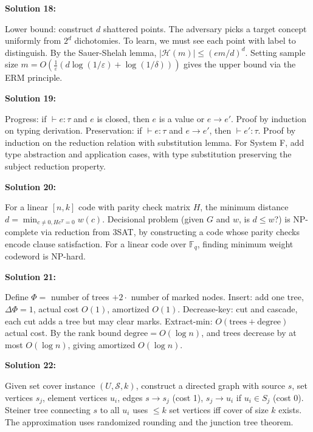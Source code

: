 \documentclass[12pt,a4paper]{exam}
\begin{document}
\vspace{0.5cm}

\textbf{Solution 18:}

Lower bound: construct $d$ shattered points. The adversary picks a target concept uniformly from $2^d$ dichotomies. To learn, we must see each point with label to distinguish. By the Sauer-Shelah lemma, $|\mathcal{H}(m)| \leq (em/d)^d$. Setting sample size $m = O(\frac{1}{\varepsilon}(d \log(1/\varepsilon) + \log(1/\delta)))$ gives the upper bound via the ERM principle.

\vspace{0.5cm}

\textbf{Solution 19:}

Progress: if $\vdash e: \tau$ and $e$ is closed, then $e$ is a value or $e \to e'$. Proof by induction on typing derivation. Preservation: if $\vdash e: \tau$ and $e \to e'$, then $\vdash e': \tau$. Proof by induction on the reduction relation with substitution lemma. For System F, add type abstraction and application cases, with type substitution preserving the subject reduction property.

\vspace{0.5cm}

\textbf{Solution 20:}

For a linear $[n,k]$ code with parity check matrix $H$, the minimum distance $d = \min_{c \neq 0, Hc^T=0} w(c)$. Decisional problem (given $G$ and $w$, is $d \leq w$?) is NP-complete via reduction from 3SAT, by constructing a code whose parity checks encode clause satisfaction. For a linear code over $\mathbb{F}_q$, finding minimum weight codeword is NP-hard.

\vspace{0.5cm}

\textbf{Solution 21:}

Define $\Phi =$ number of trees $+ 2 \cdot$ number of marked nodes. Insert: add one tree, $\Delta\Phi = 1$, actual cost $O(1)$, amortized $O(1)$. Decrease-key: cut and cascade, each cut adds a tree but may clear marks. Extract-min: $O(\text{trees} + \text{degree})$ actual cost. By the rank bound $\text{degree} = O(\log n)$, and trees decrease by at most $O(\log n)$, giving amortized $O(\log n)$.

\vspace{0.5cm}

\textbf{Solution 22:}

Given set cover instance $(U,\mathcal{S},k)$, construct a directed graph with source $s$, set vertices $s_j$, element vertices $u_i$, edges $s \to s_j$ (cost 1), $s_j \to u_i$ if $u_i \in S_j$ (cost 0). Steiner tree connecting $s$ to all $u_i$ uses $\leq k$ set vertices iff cover of size $k$ exists. The approximation uses randomized rounding and the junction tree theorem.
\end{document}
